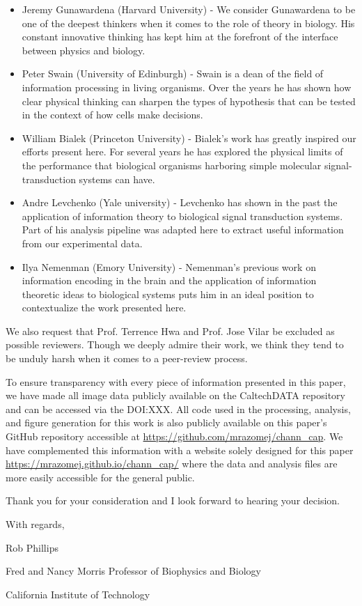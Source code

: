 \begin{itemize}
	\item Jeremy Gunawardena (Harvard University) - We consider Gunawardena to be
	one of the deepest thinkers when it comes to the role of theory in biology.
	His constant innovative thinking has kept him at the forefront of the
	interface between physics and biology.
	\item Peter Swain (University of Edinburgh) - Swain is a dean of the field of
	information processing in living organisms. Over the years he has shown how
	clear physical thinking can sharpen the types of hypothesis that can be tested
	in the context of how cells make decisions.
	\item William Bialek (Princeton University) - Bialek's work has greatly
	inspired our efforts present here. For several years he has explored the
	physical limits of the performance that biological organisms harboring simple
	molecular signal-transduction systems can have.
	\item Andre Levchenko (Yale university) - Levchenko has shown in the past the
	application of information theory to biological signal transduction systems.
	Part of his analysis pipeline was adapted here to extract useful information
	from our experimental data.
	\item Ilya Nemenman (Emory University) -  Nemenman's previous work on
	information encoding in the brain and the application of information theoretic
	ideas to biological systems puts him in an ideal position to contextualize the
	work presented here.
\end{itemize}

We also request that Prof. Terrence Hwa and Prof. Jose Vilar be excluded as
possible reviewers. Though we deeply admire their work, we think they tend to be
unduly harsh when it comes to a peer-review process.

To ensure transparency with every piece of information presented in this paper,
we have made all image data publicly available on the CaltechDATA repository
and can be accessed via the DOI:XXX. All code used in the processing, analysis,
and figure generation for this work is also publicly available on this paper's
GitHub repository accessible at \url{https://github.com/mrazomej/chann_cap}.
We have complemented this information with a website solely designed for this
paper \url{https://mrazomej.github.io/chann_cap/} where the data and analysis
files are more easily accessible for the general public.

Thank you for your consideration and I look forward to hearing your decision.

\noindent
With regards,

\noindent
Rob Phillips

\noindent
Fred and Nancy Morris Professor of Biophysics and Biology

\noindent
California Institute of Technology


